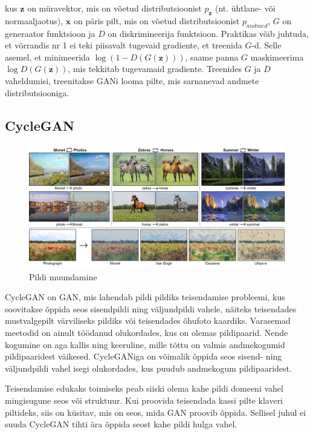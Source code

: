 \documentclass{vilgym}
\begin{document}
	kus $ \boldsymbol{z} $ on müravektor, mis on võetud distributsioonist $ p_{\boldsymbol{z}} $ (nt. ühtlane- või normaaljaotus), $ \boldsymbol{x} $ on päris pilt, mis on võetud distributsioonist $ p_{andmed} $, $ G $ on generaator funktsioon ja $ D $ on diskrimineerija funktsioon. Praktikas võib juhtuda, et võrrandis nr 1 ei teki piisavalt tugevaid gradiente, et treenida $ G $-d. Selle asemel, et minimeerida $ \log (1 - D(G(\boldsymbol{z}))) $, saame panna $ G $ maskimeerima $ \log D(G(\boldsymbol{z})) $, mis tekkitab tugevamaid gradiente. Treenides $ G $ ja $ D $ vaheldumisi, treenitakse GANi looma pilte, mis sarnanevad andmete distributsiooniga. \parencite{gan}

	\subsection{CycleGAN}
	\begin{figure}
		\centering
			\includegraphics[width=\linewidth]{images/cyclegan.jpg}
			\caption{Pildi muundamine}
			\label{fig:cyclegan}
	\end{figure}


	CycleGAN on GAN, mis lahendab pildi pildiks teisendamise probleemi, kus soovitakse õppida seos sisendpildi ning väljundpildi vahele, näiteks teisendades mustvalgepilt värviliseks pildiks või teisendades õhufoto kaardiks. Varasemad meetodid on ainult töödanud olukordades, kus on olemas pildipaarid. Nende kogumine on aga kallis ning keeruline, mille tõttu on valmis andmekogumid pildipaaridest väikesed. CycleGANiga on võimalik õppida seos sisend- ning väljundpildi vahel isegi olukordades, kus puudub andmekogum pildipaaridest. 

	Teisendamise edukaks toimiseks peab siiski olema kahe pildi domeeni vahel mingisugune seos või struktuur. Kui proovida teisendada kassi pilte klaveri piltideks, siis on küsitav, mis on seos, mida GAN proovib õppida. Sellisel juhul ei suuda CycleGAN tihti ära õppida seost kahe pildi hulga vahel.
\end{document}
